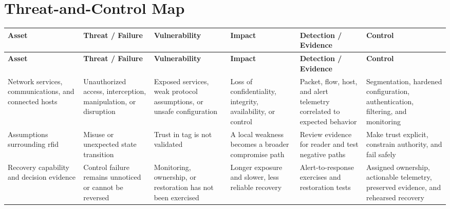 \documentclass[11pt,letterpaper]{article}
\begin{document}
\section*{Threat-and-Control Map}
\begingroup\scriptsize\setlength{\tabcolsep}{2pt}
\begin{longtable}{>{\raggedright\arraybackslash}p{}>{\raggedright\arraybackslash}p{}>{\raggedright\arraybackslash}p{}>{\raggedright\arraybackslash}p{}>{\raggedright\arraybackslash}p{}>{\raggedright\arraybackslash}p{}}
\toprule\rowcolor{Navy}\color{white}\textbf{Asset} & \color{white}\textbf{Threat / Failure} & \color{white}\textbf{Vulnerability} & \color{white}\textbf{Impact} & \color{white}\textbf{Detection / Evidence} & \color{white}\textbf{Control}\\\midrule
\endfirsthead
\toprule\rowcolor{Navy}\color{white}\textbf{Asset} & \color{white}\textbf{Threat / Failure} & \color{white}\textbf{Vulnerability} & \color{white}\textbf{Impact} & \color{white}\textbf{Detection / Evidence} & \color{white}\textbf{Control}\\\midrule
\endhead
Network services, communications, and connected hosts & Unauthorized access, interception, manipulation, or disruption & Exposed services, weak protocol assumptions, or unsafe configuration & Loss of confidentiality, integrity, availability, or control & Packet, flow, host, and alert telemetry correlated to expected behavior & Segmentation, hardened configuration, authentication, filtering, and monitoring\\\midrule
Assumptions surrounding rfid & Misuse or unexpected state transition & Trust in tag is not validated & A local weakness becomes a broader compromise path & Review evidence for reader and test negative paths & Make trust explicit, constrain authority, and fail safely\\\midrule
Recovery capability and decision evidence & Control failure remains unnoticed or cannot be reversed & Monitoring, ownership, or restoration has not been exercised & Longer exposure and slower, less reliable recovery & Alert-to-response exercises and restoration tests & Assigned ownership, actionable telemetry, preserved evidence, and rehearsed recovery\\\midrule
\bottomrule
\end{longtable}
\endgroup
\end{document}
